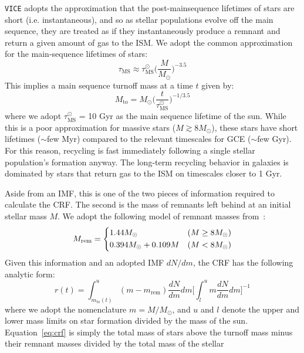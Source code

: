 \documentclass{report}
\begin{document}
\texttt{VICE} adopts the approximation that the post-mainsequence lifetimes of 
stars are short (i.e. instantaneous), and so as stellar populations evolve off 
the main sequence, they are treated as if they instantaneously produce a 
remnant and return a given amount of gas to the ISM. We adopt the common 
approximation for the main-sequence lifetimes of stars: 
\begin{equation}
\label{eq:tau_ms}
\tau_\text{MS} \approx \tau_\text{MS}^\odot\Big(\frac{M}{M_\odot}\Big)^{-3.5}
\end{equation}
This implies a main sequence turnoff mass at a time $t$ given by: 
\begin{equation}
\label{eq:mto}
M_\text{to} = M_\odot\Big(\frac{t}{\tau_\text{MS}^\odot}\Big)^{-1/3.5}
\end{equation}
where we adopt $\tau_\text{MS}^\odot$ = 10 Gyr as the main sequence lifetime 
of the sun. While this is a poor approximation for massive stars ($M \gtrsim 
8M_\odot$), these stars have short lifetimes ($\sim$few Myr) compared to the 
relevant timescales for GCE ($\sim$few Gyr). For this reason, recycling is 
fast immediately following a single stellar population's formation anyway. 
The long-term recycling behavior in galaxies is dominated by stars that return 
gas to the ISM on timescales closer to 1 Gyr. 
\par
Aside from an IMF, this is one of the two pieces of information required to 
calculate the CRF. The second is the mass of remnants 
left behind at an initial stellar mass $M$. We adopt the following model of 
remnant masses from~\citet{Kalirai2008}: 
\begin{equation}
M_\text{rem} = \begin{dcases} 
1.44 M_\odot & (M \geq 8 M_\odot) \\ 
0.394M_\odot + 0.109M & (M < 8 M_\odot)
\end{dcases}
\end{equation}
Given this information and an adopted IMF $dN/dm$, the CRF has the following 
analytic form: 
\begin{equation}
\label{eq:crf}
r(t) = \int_{m_\text{to}(t)}^u(m - m_\text{rem})\frac{dN}{dm}dm\Big[\int_l^u m
\frac{dN}{dm}dm\Big]^{-1} 
\end{equation}
where we adopt the nomenclature $m = M/M_\odot$, and $u$ and $l$ denote the 
upper and lower mass limits on star formation divided by the mass of the 
sun. Equation~\ref{eq:crf} is simply the total mass of stars above the turnoff 
mass minus their remnant masses divided by the total mass of the stellar 
\end{document}

